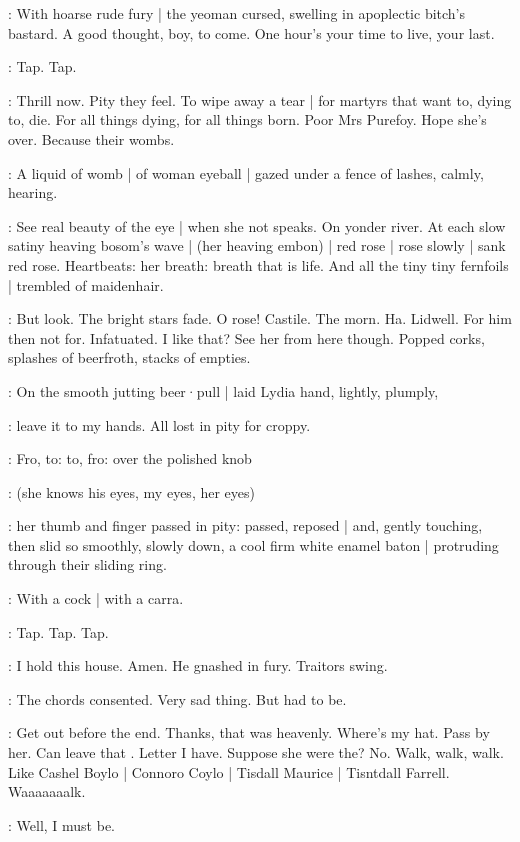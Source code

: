 :
With hoarse rude fury |
the yeoman cursed,
swelling in apoplectic bitch's bastard.
A good thought,
boy,
to come.
One hour's your time to live,
your last.

\stripling:
Tap.
Tap.

\BloomIntB:
Thrill now.
Pity they feel.
To wipe away a tear |
for martyrs that want to,
dying to,
die.
For all things dying,
for all things born.
Poor Mrs Purefoy.
Hope she's over.
Because their wombs.

:
A liquid of womb |
of woman eyeball |
gazed under a fence of lashes,
calmly,
hearing.

\BloomIntA:
See real beauty of the eye |
when she not speaks.
On yonder river.
At each slow satiny heaving bosom's wave |
(her heaving embon) |
red rose |
rose slowly |
sank red rose.
Heartbeats:
her breath:
breath that is life.
And all the tiny tiny fernfoils |
trembled of maidenhair.

\BloomIntA:
But look.
The bright stars fade.
O rose!
Castile.
The morn.
Ha.
Lidwell.
For him then not for.
Infatuated.
I like that?
See her from here though.
Popped corks,
splashes of beerfroth,
stacks of empties.

:
On the smooth jutting beer·pull |
laid Lydia hand,
lightly,
plumply,

\BloomIntA:
leave it to my hands.
All lost in pity for croppy.

:
Fro,
to:
to,
fro:
over the polished knob

\BloomIntA:
(she knows his eyes,
my eyes,
her eyes)

:
her thumb and finger passed in pity:
passed,
reposed |
and, gently touching,
then slid so smoothly,
slowly down,
a cool firm white enamel baton |
protruding through their sliding ring.

\BloomIntB:
With a cock |
with a carra.

\stripling:
Tap.
Tap.
Tap.

:
I hold this house.
Amen.
He gnashed in fury.
Traitors swing.

:
The chords consented.
Very sad thing.
But had to be.

\BloomIntA:
Get out before the end.
Thanks,
that was heavenly.
Where's my hat.
Pass by her.
Can leave that .
Letter I have.
Suppose she were the?
No.
Walk,
walk,
walk.
Like Cashel Boylo |
Connoro Coylo |
Tisdall Maurice |
Tisntdall Farrell.
Waaaaaaalk.

\Bloom:
Well,
I must be.

